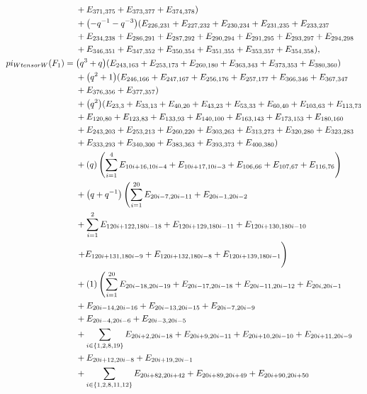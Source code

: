 \documentclass[10pt,a4paper]{amsart}
\numberwithin{equation}{section}
\theoremstyle{definition}
\def\pi{pi}
\def\otimes{ tensor }
\begin{document}
\begin{align*}
&+E_{371,375}+E_{373,377}+E_{374,378})\\
&+\bigl(-q^{-1} - q^{-3}\bigr)(E_{226,231}+E_{227,232}+E_{230,234}+E_{231,235}+E_{233,237}\\
&+E_{234,238}+E_{286,291}+E_{287,292}+E_{290,294}+E_{291,295}+E_{293,297}+E_{294,298}\\
&+E_{346,351}+E_{347,352}+E_{350,354}+E_{351,355}+E_{353,357}+E_{354,358}),
\\
 \pi_{W \otimes W}(F_1) ={}
&\bigl(q^3 + q\bigr)(E_{243,163}+E_{253,173}+E_{260,180}+E_{363,343}+E_{373,353}+E_{380,360})\\
&+\bigl(q^2 + 1\bigr)(E_{246,166}+E_{247,167}+E_{256,176}+E_{257,177}+E_{366,346}+E_{367,347}\\
&+E_{376,356}+E_{377,357})\\
&+\bigl(q^2\bigr)(E_{23,3}+E_{33,13}+E_{40,20}+E_{43,23}+E_{53,33}+E_{60,40}+E_{103,63}+E_{113,73}\\
&+E_{120,80}+E_{123,83}+E_{133,93}+E_{140,100}+E_{163,143}+E_{173,153}+E_{180,160}\\
&+E_{243,203}+E_{253,213}+E_{260,220}+E_{303,263}+E_{313,273}+E_{320,280}+E_{323,283}\\
&+E_{333,293}+E_{340,300}+E_{383,363}+E_{393,373}+E_{400,380})\\
&+(q)\left(\sum_{i=1}^{4} E_{10i+16,10i-4} + E_{10i+17,10i-3} + E_{106,66} + E_{107,67} + E_{116,76} \vphantom{\sum_{i=1}^4}\right) \\
&+\bigl(q + q^{-1}\bigr)\left(\sum_{i=1}^{20} E_{20i-7,20i-11} + E_{20i-1,20i-2} \right. \\
&+ \sum_{i=1}^2 E_{120i+122,180i-18} + E_{120i+129,180i-11} + E_{120i+130,180i-10} \\
&\left. + E_{120i+131,180i-9} + E_{120i+132,180i-8} + E_{120i+139,180i-1} \vphantom{\sum_{i=1}^{20}}\right) \\
&+(1)\left(\sum_{i=1}^{20} E_{20i-18,20i-19} + E_{20i-17,20i-18} + E_{20i-11,20i-12} +E_{20i,20i-1} \right. \\
&+ E_{20i-14,20i-16}+ E_{20i-13,20i-15} + E_{20i-7,20i-9}\\& + E_{20i-4,20i-6} + E_{20i-3,20i-5} \\
&+ \sum_{i \in \{1,2,8,19\}} E_{20i+2,20i-18} + E_{20i+9,20i-11} + E_{20i+10,20i-10} + E_{20i+11,20i-9}\\
& + E_{20i+12,20i-8} + E_{20i+19,20i-1} \\
&+ \sum_{i \in \{1,2,8,11,12\}} E_{20i+82,20i+42} + E_{20i+89,20i+49} + E_{20i+90,20i+50} \\

\end{align*}
\end{document}
